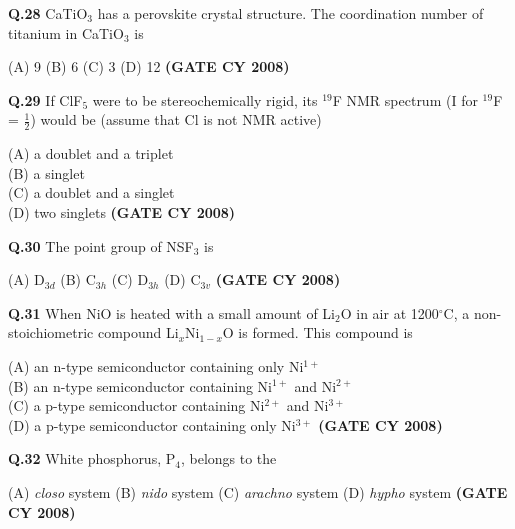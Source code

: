 \documentclass[12pt]{article}
\begin{document}
\begin{enumerate}
\vspace{0.5cm}

\textbf{Q.28} CaTiO$_3$ has a perovskite crystal structure. The coordination number of titanium in CaTiO$_3$ is

(A) 9 \hspace{1cm}
(B) 6 \hspace{1cm}
(C) 3 \hspace{1cm}
(D) 12   \textbf{(GATE CY 2008)}


\vspace{0.5cm}

\textbf{Q.29} If ClF$_5$ were to be stereochemically rigid, its $^{19}$F NMR spectrum (I for $^{19}$F = $\frac{1}{2}$) would be (assume that Cl is not NMR active)

(A) a doublet and a triplet\\
(B) a singlet\\
(C) a doublet and a singlet\\
(D) two singlets   \textbf{(GATE CY 2008)}


\vspace{0.5cm}

\textbf{Q.30} The point group of NSF$_3$ is

(A) D$_{3d}$ \hspace{1cm}
(B) C$_{3h}$ \hspace{1cm}
(C) D$_{3h}$ \hspace{1cm}
(D) C$_{3v}$   \textbf{(GATE CY 2008)}


\textbf{Q.31} When NiO is heated with a small amount of Li$_2$O in air at 1200$^\circ$C, a non-stoichiometric compound Li$_x$Ni$_{1-x}$O is formed. This compound is

(A) an n-type semiconductor containing only Ni$^{1+}$\\
(B) an n-type semiconductor containing Ni$^{1+}$ and Ni$^{2+}$\\
(C) a p-type semiconductor containing Ni$^{2+}$ and Ni$^{3+}$\\
(D) a p-type semiconductor containing only Ni$^{3+}$   \textbf{(GATE CY 2008)}


\vspace{0.5cm}

\textbf{Q.32} White phosphorus, P$_4$, belongs to the

(A) \textit{closo} system \hspace{1cm}
(B) \textit{nido} system \hspace{1cm}
(C) \textit{arachno} system \hspace{1cm}
(D) \textit{hypho} system   \textbf{(GATE CY 2008)}



\end{enumerate}
\end{document}
